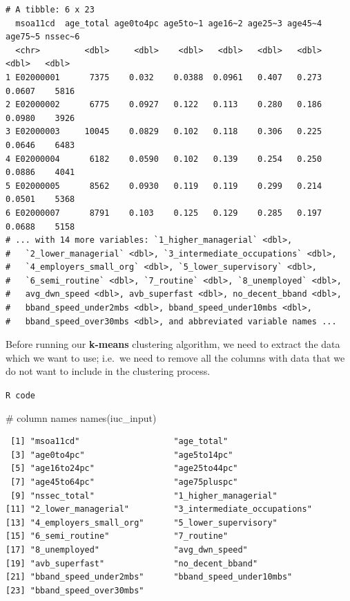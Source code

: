 \documentclass[
  letterpaper,
  DIV=11,
  numbers=noendperiod]{scrreprt}
\newenvironment{Shaded}{\begin{snugshade}}{\end{snugshade}}
\newcommand{\CommentTok}[1]{\textcolor[rgb]{0.37,0.37,0.37}{#1}}
\newcommand{\FunctionTok}[1]{\textcolor[rgb]{0.28,0.35,0.67}{#1}}
\newcommand{\NormalTok}[1]{\textcolor[rgb]{0.00,0.23,0.31}{#1}}
\begin{document}
\begin{verbatim}
# A tibble: 6 x 23
  msoa11cd  age_total age0to4pc age5to~1 age16~2 age25~3 age45~4 age75~5 nssec~6
  <chr>         <dbl>     <dbl>    <dbl>   <dbl>   <dbl>   <dbl>   <dbl>   <dbl>
1 E02000001      7375    0.032    0.0388  0.0961   0.407   0.273  0.0607    5816
2 E02000002      6775    0.0927   0.122   0.113    0.280   0.186  0.0980    3926
3 E02000003     10045    0.0829   0.102   0.118    0.306   0.225  0.0646    6483
4 E02000004      6182    0.0590   0.102   0.139    0.254   0.250  0.0886    4041
5 E02000005      8562    0.0930   0.119   0.119    0.299   0.214  0.0501    5368
6 E02000007      8791    0.103    0.125   0.129    0.285   0.197  0.0688    5158
# ... with 14 more variables: `1_higher_managerial` <dbl>,
#   `2_lower_managerial` <dbl>, `3_intermediate_occupations` <dbl>,
#   `4_employers_small_org` <dbl>, `5_lower_supervisory` <dbl>,
#   `6_semi_routine` <dbl>, `7_routine` <dbl>, `8_unemployed` <dbl>,
#   avg_dwn_speed <dbl>, avb_superfast <dbl>, no_decent_bband <dbl>,
#   bband_speed_under2mbs <dbl>, bband_speed_under10mbs <dbl>,
#   bband_speed_over30mbs <dbl>, and abbreviated variable names ...
\end{verbatim}

Before running our \textbf{k-means} clustering algorithm, we need to
extract the data which we want to use; i.e.~we need to remove all the
columns with data that we do not want to include in the clustering
process.

\begin{codelisting}

\caption{\texttt{R code}}

\begin{Shaded}
\begin{Highlighting}[]
\CommentTok{\# column names}
\FunctionTok{names}\NormalTok{(iuc\_input)}
\end{Highlighting}
\end{Shaded}

\end{codelisting}

\begin{verbatim}
 [1] "msoa11cd"                   "age_total"                 
 [3] "age0to4pc"                  "age5to14pc"                
 [5] "age16to24pc"                "age25to44pc"               
 [7] "age45to64pc"                "age75pluspc"               
 [9] "nssec_total"                "1_higher_managerial"       
[11] "2_lower_managerial"         "3_intermediate_occupations"
[13] "4_employers_small_org"      "5_lower_supervisory"       
[15] "6_semi_routine"             "7_routine"                 
[17] "8_unemployed"               "avg_dwn_speed"             
[19] "avb_superfast"              "no_decent_bband"           
[21] "bband_speed_under2mbs"      "bband_speed_under10mbs"    
[23] "bband_speed_over30mbs"     
\end{verbatim}
\end{document}
